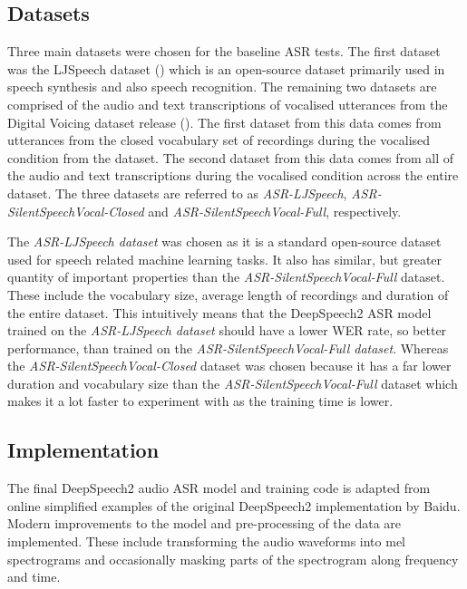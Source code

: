 \subsection{Datasets}

Three main datasets were chosen for the baseline ASR tests. The first dataset
was the LJSpeech dataset
(\cite{ljspeech17})
which is an open-source dataset primarily used in
speech synthesis and also speech recognition. The remaining two datasets
are comprised of the audio and text transcriptions of vocalised
utterances from the Digital Voicing dataset release (\cite{gaddy2020digital}).
The first dataset from this data comes from utterances from the closed
vocabulary set of recordings during the vocalised condition from the dataset.
The second dataset from this data comes from
all of the audio and text transcriptions during the vocalised condition across
the entire dataset. The three datasets are referred to as
\textit{ASR-LJSpeech}, \textit{ASR-SilentSpeechVocal-Closed} and
\textit{ASR-SilentSpeechVocal-Full},
respectively.

The \textit{ASR-LJSpeech dataset} was chosen as it is a standard open-source dataset
used for speech related machine learning tasks. It also has similar, but greater
quantity of important properties than the \textit{ASR-SilentSpeechVocal-Full} dataset.
These include the vocabulary size,
average length of recordings and duration of the entire dataset. This intuitively
means that the DeepSpeech2 ASR model trained on the \textit{ASR-LJSpeech dataset} should
have a lower WER rate, so better performance, than trained on
the \textit{ASR-SilentSpeechVocal-Full dataset}.
Whereas the \textit{ASR-SilentSpeechVocal-Closed} dataset was chosen because it has
a far lower duration and vocabulary size than the \textit{ASR-SilentSpeechVocal-Full}
dataset which makes it a lot faster to experiment with as the training time is
lower.

\subsection{Implementation}

The final DeepSpeech2 audio ASR model and training code is adapted from
online simplified examples of the original DeepSpeech2 implementation by Baidu.
Modern improvements to the model and pre-processing of the data are implemented.
These include transforming the audio waveforms into mel spectrograms and
occasionally masking parts of the spectrogram along frequency and time.

